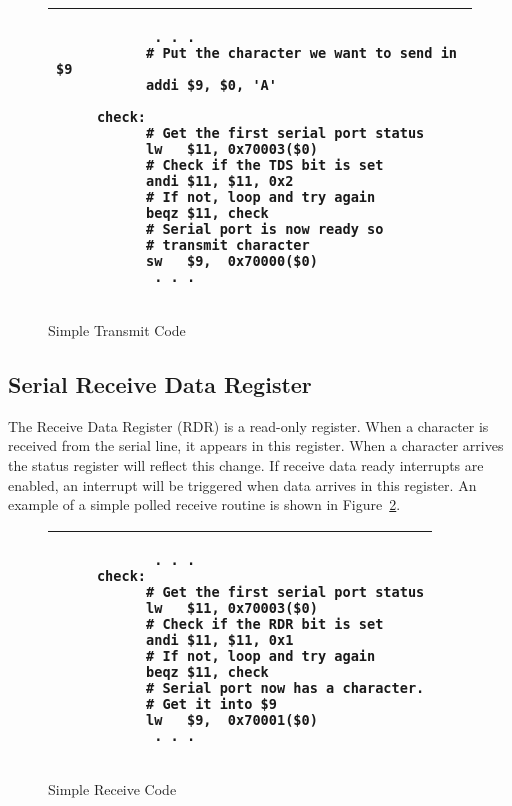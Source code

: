 \begin{figure}[h]
\begin{footnotesize}
\begin{center}
\begin{tabular}{|p{8cm}|}
\hline
\begin{verbatim}
            . . .
           # Put the character we want to send in $9
           addi $9, $0, 'A'
           
     check: 
           # Get the first serial port status
           lw   $11, 0x70003($0)
           # Check if the TDS bit is set
           andi $11, $11, 0x2
           # If not, loop and try again
           beqz $11, check
           # Serial port is now ready so
           # transmit character
           sw   $9,  0x70000($0)
            . . .
\end{verbatim}
\\
\hline
\end{tabular}
\end{center}
\end{footnotesize}
\caption{Simple Transmit Code}
\label{code:serial_tran}
\end{figure}

\subsection{Serial Receive Data Register}

The Receive Data Register (RDR) is a read-only register. When a
character is received from the serial line, it appears in this
register. When a character arrives the status register will reflect
this change. If receive data ready interrupts are enabled, an
interrupt will be triggered when data arrives in this register. An
example of a simple polled receive routine is shown in
Figure~\ref{code:serial_rec}.

\begin{figure}[h]
\begin{footnotesize}
\begin{center}
\begin{tabular}{|p{8cm}|}
\hline
\begin{verbatim}
            . . .
     check: 
           # Get the first serial port status
           lw   $11, 0x70003($0)
           # Check if the RDR bit is set
           andi $11, $11, 0x1
           # If not, loop and try again
           beqz $11, check
           # Serial port now has a character.
           # Get it into $9
           lw   $9,  0x70001($0)
            . . .
\end{verbatim}
\\
\hline
\end{tabular}
\end{center}
\end{footnotesize}
\caption{Simple Receive Code}
\label{code:serial_rec}
\end{figure}

